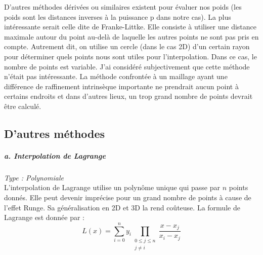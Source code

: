 D'autres méthodes dérivées ou similaires existent pour évaluer nos poids (les poids sont les distances inverses à la puissance p dans notre cas). La plus intéressante serait celle dite de Franke-Littke. Elle consiste à utiliser une distance maximale autour du point au-delà de laquelle les autres points ne sont pas pris en compte. Autrement dit, on utilise un cercle (dans le cas 2D) d'un certain rayon pour déterminer quels points nous sont utiles pour l'interpolation. Dans ce cas, le nombre de points est variable.
J'ai considéré subjectivement que cette méthode n'était pas intéressante. La méthode confrontée à un maillage ayant une différence de raffinement intrinsèque importante ne prendrait aucun point à certains endroits et dans d'autres lieux, un trop grand nombre de points devrait être calculé.

\vspace{0,5 cm}


\newpage
\subsection{D'autres méthodes}\label{s223}

\subparagraph{a. Interpolation de Lagrange \cite{Barycentric_Lagrange1, Barycentric_Lagrange2}}
\textit{Type : Polynomiale} \\
L'interpolation de Lagrange utilise un polynôme unique qui passe par \(n\) points donnés. Elle peut devenir imprécise pour un grand nombre de points à cause de l'effet Runge. Sa généralisation en 2D et 3D la rend coûteuse. La formule de Lagrange est donnée par :
\begin{equation}
    L(x) = \sum_{i=0}^{n} y_i \prod_{\substack{0 \leq j \leq n \\ j \neq i}} \frac{x - x_j}{x_i - x_j}
\end{equation}


